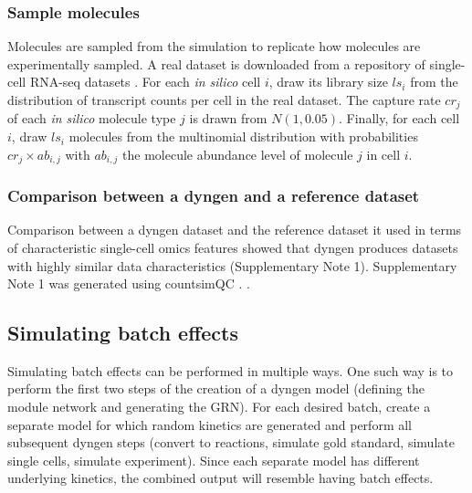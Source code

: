 \documentclass[10pt, a4paper]{article}
\begin{document}
\hypertarget{sample-molecules}{%
	\subsubsection{Sample molecules}\label{sample-molecules}}

Molecules are sampled from the simulation to replicate how molecules are
experimentally sampled. A real dataset is downloaded from a repository
of single-cell RNA-seq datasets
\cite{cannoodt_singlecellomicsdatasets_2018}. For each \emph{in
	silico} cell \(i\), draw its library size \(ls_i\) from the distribution
of transcript counts per cell in the real dataset. The capture rate
\(cr_j\) of each \emph{in silico} molecule type \(j\) is drawn from
\(N(1, 0.05)\). Finally, for each cell \(i\), draw \(ls_i\) molecules
from the multinomial distribution with probabilities
\(cr_j \times ab_{i,j}\) with \(ab_{i,j}\) the molecule abundance level
of molecule \(j\) in cell \(i\).

\hypertarget{comparison-between-a-dyngen-and-a-reference-dataset}{%
	\subsubsection{Comparison between a dyngen and a reference
		dataset}\label{comparison-between-a-dyngen-and-a-reference-dataset}}

Comparison between a dyngen dataset and the reference dataset it used in
terms of characteristic single-cell omics features showed that dyngen
produces datasets with highly similar data characteristics
(Supplementary Note 1). Supplementary Note 1 was generated using
countsimQC \cite{soneson_unifiedqualityverification_2018}. .

\hypertarget{sec:dyngen-batcheffect}{%
	\subsection{Simulating batch effects}\label{sec:dyngen-batcheffect}}

Simulating batch effects can be performed in multiple ways. One such way
is to perform the first two steps of the creation of a dyngen model
(defining the module network and generating the GRN). For each desired
batch, create a separate model for which random kinetics are generated
and perform all subsequent dyngen steps (convert to reactions, simulate
gold standard, simulate single cells, simulate experiment). Since each
separate model has different underlying kinetics, the combined output
will resemble having batch effects.
\end{document}
